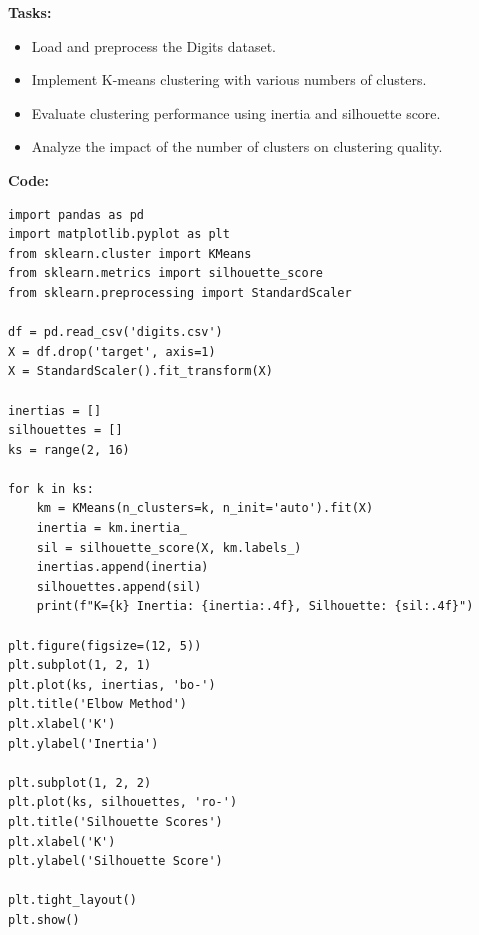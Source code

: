 \documentclass[12pt, a4paper]{article}
\begin{document}
\vspace{\baselineskip}
\noindent \textbf{Tasks:}\\
\vspace{-0.5\baselineskip}
\begin{itemize}[nosep]
    \item Load and preprocess the Digits dataset.
    \item Implement K-means clustering with various numbers of clusters.
    \item Evaluate clustering performance using inertia and silhouette score.
    \item Analyze the impact of the number of clusters on clustering quality.
\end{itemize}

\vspace{\baselineskip}
\noindent \textbf{Code:}\\
\begin{lstlisting}
import pandas as pd
import matplotlib.pyplot as plt
from sklearn.cluster import KMeans
from sklearn.metrics import silhouette_score
from sklearn.preprocessing import StandardScaler

df = pd.read_csv('digits.csv')
X = df.drop('target', axis=1)
X = StandardScaler().fit_transform(X)

inertias = []
silhouettes = []
ks = range(2, 16)

for k in ks:
    km = KMeans(n_clusters=k, n_init='auto').fit(X)
    inertia = km.inertia_
    sil = silhouette_score(X, km.labels_)
    inertias.append(inertia)
    silhouettes.append(sil)
    print(f"K={k} Inertia: {inertia:.4f}, Silhouette: {sil:.4f}")

plt.figure(figsize=(12, 5))
plt.subplot(1, 2, 1)
plt.plot(ks, inertias, 'bo-')
plt.title('Elbow Method')
plt.xlabel('K')
plt.ylabel('Inertia')

plt.subplot(1, 2, 2)
plt.plot(ks, silhouettes, 'ro-')
plt.title('Silhouette Scores')
plt.xlabel('K')
plt.ylabel('Silhouette Score')

plt.tight_layout()
plt.show()
\end{lstlisting}

\vspace{\baselineskip}
\end{document}
